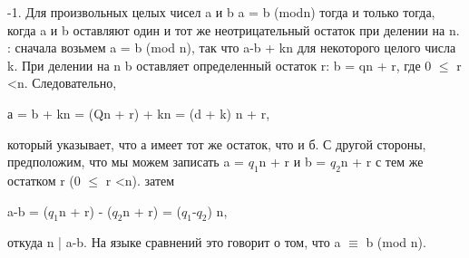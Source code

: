 \documentclass[11pt]{article}
\begin{document}
		\begin{enumerate}
			-1. Для произвольных целых чисел a и b a = b (modn) тогда и только тогда, когда a и b оставляют один и тот же неотрицательный остаток при делении на n.
			: сначала возьмем a = b (mod n), так что a-b + kn для некоторого целого числа k. При делении на n b оставляет определенный остаток r: b = qn + r, где 0 $\leq$ r <n. Следовательно,
		\end{enumerate}
	\begin{center}
		а = b + kn = (Qn + r) + kn = (d + k) n + r,
	\end{center}
	который указывает, что а имеет тот же остаток, что и б.	
	С другой стороны, предположим, что мы можем записать a = $q_{1}$n + r и b = $q_{2}$n + r с тем же остатком r (0 $\leq$ r <n). затем
	\begin{center}
		a-b = ($q_{1}$n + r) - ($q_{2}$n + r) = ($q_{1}$-$q_{2}$) n,
	\end{center}
	откуда n | a-b. На языке сравнений это говорит о том, что a $\equiv$ b (mod n).
\end{document}

